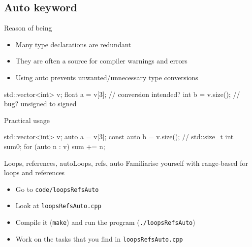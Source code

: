 \subsection[auto]{Auto keyword}

\begin{frame}[fragile]
  \begin{block}{Reason of being}
    \begin{itemize}
    \item Many type declarations are redundant
    \item They are often a source for compiler warnings and errors
    \item Using auto prevents unwanted/unnecessary type conversions
    \end{itemize}
    \begin{cppcode*}{}
      std::vector<int> v;
      float a = v[3];    // conversion intended?
      int b = v.size();  // bug? unsigned to signed
    \end{cppcode*}
  \end{block}
  \pause
  \begin{block}{Practical usage}
    \begin{cppcode*}{}
      std::vector<int> v;
      auto a = v[3];
      const auto b = v.size(); // std::size_t
      int sum{0};
      for (auto n : v) { sum += n; }
    \end{cppcode*}
  \end{block}
\end{frame}

\begin{frame}[fragile]
  \begin{exerciseWithShortcut}{Loops, references, auto}{Loops, refs, auto}
    Familiarise yourself with range-based for loops and references
    \begin{itemize}
      \item Go to \texttt{code/loopsRefsAuto}
      \item Look at \texttt{loopsRefsAuto.cpp}
      \item Compile it (\texttt{make}) and run the program (\texttt{./loopsRefsAuto})
      \item Work on the tasks that you find in \texttt{loopsRefsAuto.cpp}
    \end{itemize}
  \end{exerciseWithShortcut}
\end{frame}
